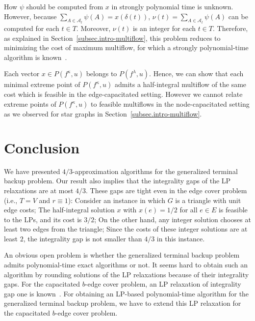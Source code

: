 \documentclass{article}
\newcommand{\Afam}{\mathcal{A}}
\newcommand{\cut}{P}
\newcommand{\f}{f^{\kappa}}
\newcommand{\g}{f^{\lambda}}
\begin{document}
How $\psi$ should be computed from $x$ in strongly polynomial time is unknown.
However, because $\sum_{A \in \Afam_t}\psi(A)=x(\delta(t))$, 
$\nu(t)=\sum_{A \in \Afam_t}\psi(A)$ can be computed for each $t \in T$.
Moreover, $\nu(t)$ is an integer for each $t \in T$.
Therefore, as explained in Section~\ref{subsec.intro-multiflow}, this problem reduces to 
minimizing the cost of maximum multiflow,
for which a strongly polynomial-time algorithm is known~\cite{Karzanov94}.
\qquad\endproof

Each vector $x \in \cut(\f,u)$ belongs to $\cut(\g,u)$. Hence,
we can show that each minimal extreme point of $\cut(\f,u)$
admits a half-integral multiflow of the same cost which is feasible in the edge-capacitated setting.
However we cannot relate extreme points of $\cut(\f,u)$ to feasible multiflows 
in the node-capacitated setting as we observed for star graphs in Section~\ref{subsec.intro-multiflow}.



\section{Conclusion}
\label{sec.conclusion}

We have presented $4/3$-approximation algorithms for the generalized terminal backup problem.
Our result also implies that the integrality gaps of 
the LP relaxations are at most $4/3$.
These gaps are tight even in 
the edge cover problem (i.e., $T=V$ and $r\equiv 1$): 
Consider an instance in which $G$ is a triangle with unit edge costs;
The half-integral solution $x$ with
$x(e)=1/2$ for all $e \in E$ is feasible to the LPs, and its cost is $3/2$;
On the other hand, any integer solution chooses at least two edges from the triangle; 
Since the costs of these integer solutions are at least $2$, the integrality gap is not smaller than $4/3$ in this instance.


An obvious open problem is whether the generalized terminal
backup problem admits polynomial-time exact algorithms or not. 
It seems hard to obtain such an algorithm by rounding
solutions of the LP relaxations because of their integrality gaps.
For the capacitated $b$-edge cover problem,
an LP relaxation of integrality gap one is known~\cite{schrijver-book}. 
For obtaining an LP-based polynomial-time algorithm for the generalized terminal backup problem,
we have to
extend this LP relaxation for the capacitated $b$-edge cover problem.
\end{document}
